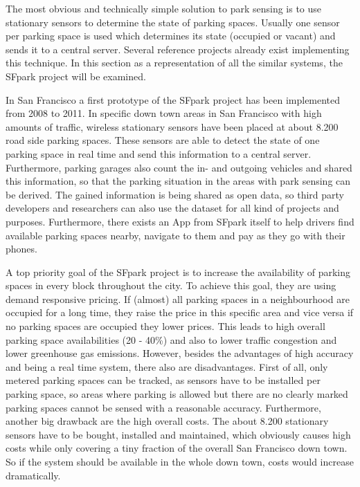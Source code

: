 The most obvious and technically simple solution to park sensing is to use stationary sensors to determine the state of parking spaces. Usually one sensor per parking space is used which determines its state (occupied or vacant) and sends it to a central server. Several reference projects already exist \cite{SFPark, VehicleSense} implementing this technique. In this section as a representation of all the similar systems, the SFpark project will be examined.

In San Francisco a first prototype of the SFpark project \cite{SFPark} has been implemented from 2008 to 2011. In specific down town areas in San Francisco with high amounts of traffic, wireless stationary sensors have been placed at about 8.200 road side parking spaces. These sensors are able to detect the state of one parking space in real time and send this information to a central server. Furthermore, parking garages also count the in- and outgoing vehicles and shared this information, so that the parking situation in the areas with park sensing can be derived. The gained information is being shared as open data, so third party developers and researchers can also use the dataset for all kind of projects and purposes. Furthermore, there exists an App from SFpark itself to help drivers find available parking spaces nearby, navigate to them and pay as they go with their phones. 

A top priority goal of the SFpark project is to increase the availability of parking spaces in every block throughout the city. To achieve this goal, they are using demand responsive pricing. If (almost) all parking spaces in a neighbourhood are occupied for a long time, they raise the price in this specific area and vice versa if no parking spaces are occupied they lower prices. This leads to high overall parking space availabilities (20 - 40\%) and also to lower traffic congestion and lower greenhouse gas emissions. However, besides the advantages of high accuracy and being a real time system, there also are disadvantages. First of all, only metered parking spaces can be tracked, as sensors have to be installed per parking space, so areas where parking is allowed but there are no clearly marked parking spaces cannot be sensed with a reasonable accuracy. Furthermore, another big drawback are the high overall costs. The about 8.200 stationary sensors have to be bought, installed and maintained, which obviously causes high costs while only covering a tiny fraction of the overall San Francisco down town. So if the system should be available in the whole down town, costs would increase dramatically.

